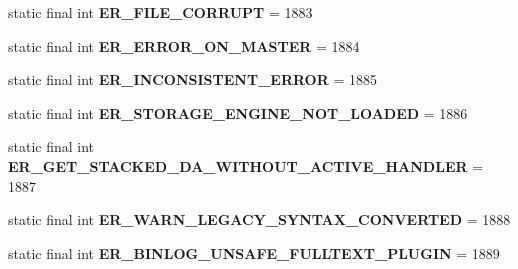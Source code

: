 \begin{DoxyCompactItemize}
static final int {\bfseries E\+R\+\_\+\+F\+I\+L\+E\+\_\+\+C\+O\+R\+R\+U\+PT} = 1883
\item 
\mbox{\label{classcom_1_1mysql_1_1cj_1_1exceptions_1_1_mysql_error_numbers_aa267ee3e69ee14af6e58866337270bb9}} 
static final int {\bfseries E\+R\+\_\+\+E\+R\+R\+O\+R\+\_\+\+O\+N\+\_\+\+M\+A\+S\+T\+ER} = 1884
\item 
\mbox{\label{classcom_1_1mysql_1_1cj_1_1exceptions_1_1_mysql_error_numbers_a50e97dbc26de6487ee426a9bc0023d2d}} 
static final int {\bfseries E\+R\+\_\+\+I\+N\+C\+O\+N\+S\+I\+S\+T\+E\+N\+T\+\_\+\+E\+R\+R\+OR} = 1885
\item 
\mbox{\label{classcom_1_1mysql_1_1cj_1_1exceptions_1_1_mysql_error_numbers_ab47be90debf12f15d8193e8e59a85471}} 
static final int {\bfseries E\+R\+\_\+\+S\+T\+O\+R\+A\+G\+E\+\_\+\+E\+N\+G\+I\+N\+E\+\_\+\+N\+O\+T\+\_\+\+L\+O\+A\+D\+ED} = 1886
\item 
\mbox{\label{classcom_1_1mysql_1_1cj_1_1exceptions_1_1_mysql_error_numbers_a70063eb40c60905e61369ce83a8d2f00}} 
static final int {\bfseries E\+R\+\_\+\+G\+E\+T\+\_\+\+S\+T\+A\+C\+K\+E\+D\+\_\+\+D\+A\+\_\+\+W\+I\+T\+H\+O\+U\+T\+\_\+\+A\+C\+T\+I\+V\+E\+\_\+\+H\+A\+N\+D\+L\+ER} = 1887
\item 
\mbox{\label{classcom_1_1mysql_1_1cj_1_1exceptions_1_1_mysql_error_numbers_a03b7b1c4f8f45717f84d2d82e5fc1997}} 
static final int {\bfseries E\+R\+\_\+\+W\+A\+R\+N\+\_\+\+L\+E\+G\+A\+C\+Y\+\_\+\+S\+Y\+N\+T\+A\+X\+\_\+\+C\+O\+N\+V\+E\+R\+T\+ED} = 1888
\item 
\mbox{\label{classcom_1_1mysql_1_1cj_1_1exceptions_1_1_mysql_error_numbers_a56819dc0669ba3f696c43f726bb695a1}} 
static final int {\bfseries E\+R\+\_\+\+B\+I\+N\+L\+O\+G\+\_\+\+U\+N\+S\+A\+F\+E\+\_\+\+F\+U\+L\+L\+T\+E\+X\+T\+\_\+\+P\+L\+U\+G\+IN} = 1889
\item 
\mbox{\label{classcom_1_1mysql_1_1cj_1_1exceptions_1_1_mysql_error_numbers_a29f184f60afa1ee7f2757c9fe534dc1b}} 

\end{DoxyCompactItemize}
